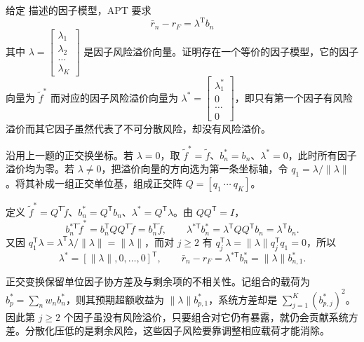 \par\noindent\begin{minipage}{\linewidth}
\begin{problem}
 给定 描述的因子模型，APT 要求
\[
    \bar{r}_{n}-r_{F}=\lambda^{\mathrm{T}}b_{n}
\]
其中 $\lambda=\begin{bmatrix}\lambda_{1} \\ \lambda_{2} \\ \ldots \\ \lambda_{K}\end{bmatrix}$ 是因子风险溢价向量。证明存在一个等价的因子模型，它的因子向量为 $\tilde{f}^{*}$ 而对应的因子风险溢价向量为 $\lambda^{*}=\begin{bmatrix}\lambda_{1}^{*} \\ 0 \\ \ldots \\ 0\end{bmatrix}$，即只有第一个因子有风险溢价而其它因子虽然代表了不可分散风险，却没有风险溢价。
\end{problem}
\end{minipage}\par
{}
\begin{solution}[label-content={证明},blank-type=manual,blank-vsep=9\baselineskip]

沿用上一题的正交换坐标。若 $\lambda=0$，取 $\widetilde f^*=\widetilde f$、$b_n^*=b_n$、$\lambda^*=0$，此时所有因子溢价均为零。若 $\lambda\ne0$，把溢价向量的方向选为第一条坐标轴，令 $q_1=\lambda/\|\lambda\|$。将其补成一组正交单位基，组成正交阵 $Q=[q_1\ \cdots\ q_K]$。

定义 $\widetilde f^*=Q^{\mathsf T}\widetilde f$、$b_n^*=Q^{\mathsf T}b_n$、$\lambda^*=Q^{\mathsf T}\lambda$。由 $QQ^{\mathsf T}=I$，
\[
 b_n^{*\mathsf T}\widetilde f^*=b_n^{\mathsf T}QQ^{\mathsf T}\widetilde f=b_n^{\mathsf T}\widetilde f,\qquad
 \lambda^{*\mathsf T}b_n^*=\lambda^{\mathsf T}QQ^{\mathsf T}b_n=\lambda^{\mathsf T}b_n.
\]
又因 $q_1^{\mathsf T}\lambda=\lambda^{\mathsf T}\lambda/\|\lambda\|=\|\lambda\|$，而对 $j\ge2$ 有 $q_j^{\mathsf T}\lambda=\|\lambda\|q_j^{\mathsf T}q_1=0$，所以
\[
 \boxed{\lambda^*=[\|\lambda\|,0,\ldots,0]^{\mathsf T}},\qquad
 \bar r_n-r_F=\lambda^{*\mathsf T}b_n^*=\|\lambda\|b_{n,1}^* .
\]

正交变换保留单位因子协方差及与剩余项的不相关性。记组合的载荷为 $b_p^*=\sum_n w_nb_n^*$，则其预期超额收益为 $\|\lambda\|b_{p,1}^*$，系统方差却是 $\sum_{j=1}^K(b_{p,j}^*)^2$。因此第 $j\ge2$ 个因子虽没有风险溢价，只要组合对它仍有暴露，就仍会贡献系统方差。分散化压低的是剩余风险，这些因子风险要靠调整相应载荷才能消除。\qedhere
\end{solution}

